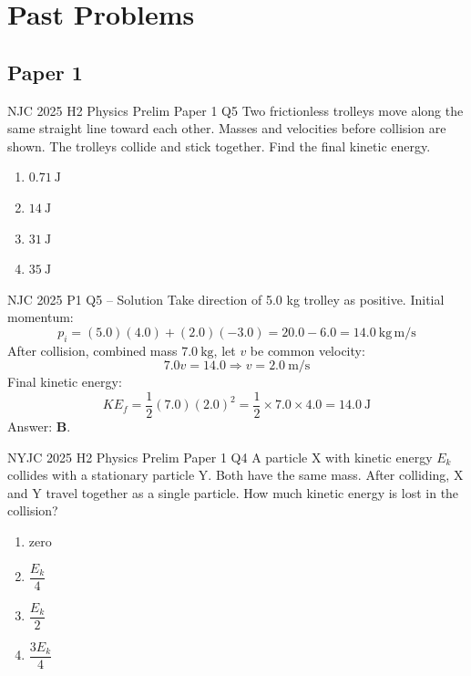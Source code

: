 \documentclass[11pt]{beamer}
\begin{document}
\section{Past Problems}

\subsection{Paper 1}

\begin{frame}[shrink=15]{NJC 2025 H2 Physics Prelim Paper 1 Q5}
Two frictionless trolleys move along the same straight line toward each other. Masses and velocities before collision are shown. The trolleys collide and stick together. Find the final kinetic energy.

\begin{center}
\end{center}
\begin{enumerate}[A]
    \item $0.71\ \mathrm{J}$
    \item $14\ \mathrm{J}$
    \item $31\ \mathrm{J}$
    \item $35\ \mathrm{J}$
\end{enumerate}
\end{frame}

\begin{frame}{NJC 2025 P1 Q5 – Solution}
Take direction of 5.0 kg trolley as positive. Initial momentum:
\[ p_i = (5.0)(4.0) + (2.0)(-3.0) = 20.0 - 6.0 = 14.0\ \mathrm{kg\,m/s} \]
After collision, combined mass $7.0\ \mathrm{kg}$, let $v$ be common velocity:
\[ 7.0 v = 14.0 \Rightarrow v = 2.0\ \mathrm{m/s} \]
Final kinetic energy:
\[ KE_f = \frac12 (7.0)(2.0)^2 = \frac12 \times 7.0 \times 4.0 = 14.0\ \mathrm{J} \]
Answer: \textbf{B}.
\end{frame}

\begin{frame}[shrink=15]{NYJC 2025 H2 Physics Prelim Paper 1 Q4}
A particle X with kinetic energy $E_k$ collides with a stationary particle Y. Both have the same mass. After colliding, X and Y travel together as a single particle. How much kinetic energy is lost in the collision?
\begin{enumerate}[A]
    \item zero
    \item $\dfrac{E_k}{4}$
    \item $\dfrac{E_k}{2}$
    \item $\dfrac{3E_k}{4}$
\end{enumerate}
\end{frame}
\end{document}
